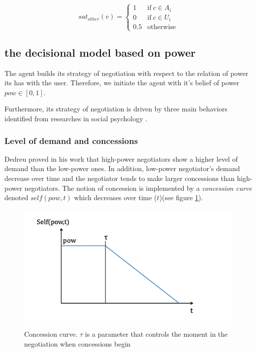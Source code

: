 \documentclass[runningheads,a4paper]{llncs}
\begin{document}
	\begin{equation}
	sat_{other}(v)= \left\{\begin{array}{ll}
	1	 & \mathrm{if\ }  c \in A_i\\
	0    & \mathrm{if\ }c \in U_i\\
	0.5	 & \mathrm{otherwise}
	\end{array}\right.
	\end{equation}
	
	\subsection{the decisional model based on power}
	
	
	
	The agent builds its strategy of negotiation with respect to the relation of power its has with the user. Therefore, we initiate the agent with it's belief of power $pow \in [0,1]$. 
	

	
	Furthermore, its strategy of negotiation is driven by three main behaviors identified from researches in social psychology \cite{de1995impact,fiske1993controlling,magee2007power,de2004influence}. 
	
	\subsubsection{Level of demand and concessions}
	
	Dedreu proved in his work \cite{de1995impact} that high-power negotiators show a higher level of demand than the low-power ones. In addition, low-power negotiator's demand decrease over time and the negotiator tends to make larger concessions than high-power negotiators. 
	The notion of concession is implemented by a \emph{concession curve} denoted  $self(pow, t)$ which decreases over time ($t$)(see figure \ref{fig:conc}). 
		\begin{figure}[h]
		\includegraphics[width= 4 in, height = 2 in]{graphs/sv3.png}
		\caption{\label{fig:conc} Concession curve. $\tau$ is a parameter that controls the moment in the negotiation when concessions begin}
		\vspace{-0.35 in}
	\end{figure} 
	
\end{document}
